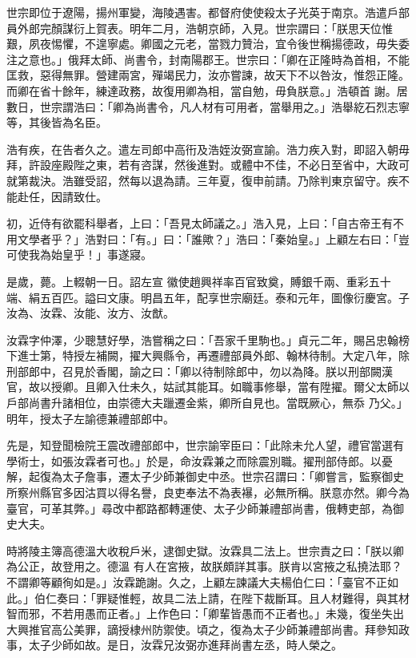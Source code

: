 \begin{pinyinscope}
 世宗即位于遼陽，揚州軍變，海陵遇害。都督府使使殺太子光英于南京。浩遣戶部員外郎完顏謀衍上賀表。明年二月，浩朝京師，入見。世宗謂曰：「朕思天位惟艱，夙夜惕懼，不遑寧處。卿國之元老，當戮力贊治，宜令後世稱揚德政，毋失委注之意也。」俄拜太師、尚書令，封南陽郡王。世宗曰：「卿在正隆時為首相，不能匡救，惡得無罪。營建兩宮，殫竭民力，汝亦嘗諫，故天下不以咎汝，惟怨正隆。而卿在省十餘年，練達政務，故復用卿為相，當自勉，毋負朕意。」浩頓首
 謝。居數日，世宗謂浩曰：「卿為尚書令，凡人材有可用者，當舉用之。」浩舉紇石烈志寧等，其後皆為名臣。



 浩有疾，在告者久之。遣左司郎中高衎及浩姪汝弼宣諭。浩力疾入對，即詔入朝毋拜，許設座殿陛之東，若有咨謀，然後進對。或體中不佳，不必日至省中，大政可就第裁決。浩雖受詔，然每以退為請。三年夏，復申前請。乃除判東京留守。疾不能赴任，因請致仕。



 初，近侍有欲罷科舉者，上曰：「吾見太師議之。」浩入見，上曰：「自古帝王有不用文學者乎？」浩對曰：「有。」曰：「誰歟？」浩曰：「秦始皇。」上顧左右曰：「豈可使我為始皇乎！」事遂寢。



 是歲，薨。上輟朝一日。詔左宣
 徽使趙興祥率百官致奠，賻銀千兩、重彩五十端、絹五百匹。謚曰文康。明昌五年，配享世宗廟廷。泰和元年，圖像衍慶宮。子汝為、汝霖、汝能、汝方、汝猷。



 汝霖字仲澤，少聰慧好學，浩嘗稱之曰：「吾家千里駒也。」貞元二年，賜呂忠翰榜下進士第，特授左補闕，擢大興縣令，再遷禮部員外郎、翰林待制。大定八年，除刑部郎中，召見於香閣，諭之曰：「卿以待制除郎中，勿以為降。朕以刑部闕漢官，故以授卿。且卿入仕未久，姑試其能耳。如職事修舉，當有陞擢。爾父太師以戶部尚書升諸相位，由崇德大夫躐遷金紫，卿所自見也。當既厥心，無忝
 乃父。」明年，授太子左諭德兼禮部郎中。



 先是，知登聞檢院王震改禮部郎中，世宗諭宰臣曰：「此除未允人望，禮官當選有學術士，如張汝霖者可也。」於是，命汝霖兼之而除震別職。擢刑部侍郎。以憂解，起復為太子詹事，遷太子少師兼御史中丞。世宗召謂曰：「卿嘗言，監察御史所察州縣官多因沽買以得名譽，良吏奉法不為表襮，必無所稱。朕意亦然。卿今為臺官，可革其弊。」尋改中都路都轉運使、太子少師兼禮部尚書，俄轉吏部，為御史大夫。



 時將陵主簿高德溫大收稅戶米，逮御史獄。汝霖具二法上。世宗責之曰：「朕以卿為公正，故登用之。德溫
 有人在宮掖，故朕頗詳其事。朕肯以宮掖之私撓法耶？不謂卿等顧徇如是。」汝霖跪謝。久之，上顧左諫議大夫楊伯仁曰：「臺官不正如此。」伯仁奏曰：「罪疑惟輕，故具二法上請，在陛下裁斷耳。且人材難得，與其材智而邪，不若用愚而正者。」上作色曰：「卿輩皆愚而不正者也。」未幾，復坐失出大興推官高公美罪，謫授棣州防禦使。頃之，復為太子少師兼禮部尚書。拜參知政事，太子少師如故。是日，汝霖兄汝弼亦進拜尚書左丞，時人榮之。




\end{pinyinscope}
